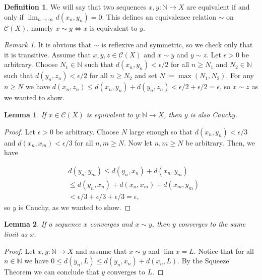 \documentclass{report}
\newtheorem{lemma}{Lemma}[section]
\theoremstyle{definition}
\newtheorem{definition}{Definition}[section]
\theoremstyle{remark}
\newtheorem{remark}{Remark}[section]
\newcommand{\N}{\mathbb{N}}
\newcommand{\prt}[1]{\mathcal{#1}}
\let\oldmax\max
\renewcommand{\max}[1]{\oldmax \left( #1 \right)}
\begin{document}
\begin{definition}
   We will say that two sequences $x,y: \N \to X$ are equivalent if and only if $\lim_{n \to \infty} d(x_n, y_n) = 0$. This defines an equivalence relation $\sim$ on $\prt{C}(X)$, namely $x \sim y \iff \text{$x$ is equivalent to $y$}$.
\end{definition}

\begin{remark}
     It is obvious that $\sim$ is reflexive and symmetric, so we check only that it is transitive. Assume that $x, y, z \in \prt{C}(X)$ and $x\sim y$ and $y \sim z$. Let $\epsilon > 0$ be arbitrary. Choose $N_1 \in \N$ such that $d(x_n, y_n) < \epsilon/2$ for all $n \geq N_1$ and $N_2 \in \N$ such that $d(y_n, z_n) < \epsilon/2$ for all $n \geq N_2$ and set $N := \max{N_1, N_2}$. For any $n \geq N$ we have $d(x_n, z_n) \leq d(x_n, y_n) + d(y_n, z_n) < \epsilon/2 + \epsilon/2 = \epsilon$, so $x \sim z$ as we wanted to show.
\end{remark}

\begin{lemma} \label{lem_equivIsCauchy}
    If $x \in \prt{C}(X)$ is equivalent to $y: \N \to X$, then $y$ is also Cauchy.
\end{lemma}

\begin{proof}
    Let $\epsilon > 0$ be arbitrary. Choose $N$ large enough so that $d(x_n, y_n) < \epsilon/3$ and $d(x_n, x_m) < \epsilon/3$ for all $n,m \geq N$. Now let $n,m \geq N$ be arbitrary. Then, we have
    
    \begin{align*}
        &d(y_n, y_m) \leq d(y_n, x_n) + d(x_n, y_m) \\
        &\leq d(y_n, x_n) + d(x_n, x_m) + d(x_m, y_m) \\
        &< \epsilon/3 + \epsilon/3 + \epsilon/3 = \epsilon,
    \end{align*} so $y$ is Cauchy, as we wanted to show.
\end{proof}

\begin{lemma} \label{lem_equivConvergeToSameLimit}
    If a sequence $x$ converges and $x \sim y$, then $y$ converges to the same limit as $x$.
\end{lemma}

\begin{proof}
    Let $x, y: \N \to X$ and assume that $x \sim y$ and $\lim x = L$. Notice that for all $n \in \N$ we have $0 \leq d(y_n, L) \leq d(y_n, x_n) + d(x_n, L)$. By the Squeeze Theorem we can conclude that $y$ converges to $L$.
\end{proof}
\end{document}
